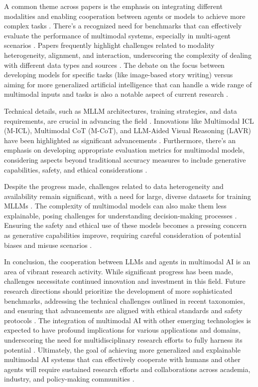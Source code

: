 \documentclass[conference]{IEEEtran}
\begin{document}
A common theme across papers is the emphasis on integrating different modalities and enabling cooperation between agents or models to achieve more complex tasks \cite{b5}. There's a recognized need for benchmarks that can effectively evaluate the performance of multimodal systems, especially in multi-agent scenarios \cite{b6}. Papers frequently highlight challenges related to modality heterogeneity, alignment, and interaction, underscoring the complexity of dealing with different data types and sources \cite{b7}. The debate on the focus between developing models for specific tasks (like image-based story writing) versus aiming for more generalized artificial intelligence that can handle a wide range of multimodal inputs and tasks is also a notable aspect of current research \cite{b8}.

Technical details, such as MLLM architectures, training strategies, and data requirements, are crucial in advancing the field \cite{b9}. Innovations like Multimodal ICL (M-ICL), Multimodal CoT (M-CoT), and LLM-Aided Visual Reasoning (LAVR) have been highlighted as significant advancements \cite{b10}. Furthermore, there's an emphasis on developing appropriate evaluation metrics for multimodal models, considering aspects beyond traditional accuracy measures to include generative capabilities, safety, and ethical considerations \cite{b11}.

Despite the progress made, challenges related to data heterogeneity and availability remain significant, with a need for large, diverse datasets for training MLLMs \cite{b12}. The complexity of multimodal models can also make them less explainable, posing challenges for understanding decision-making processes \cite{b13}. Ensuring the safety and ethical use of these models becomes a pressing concern as generative capabilities improve, requiring careful consideration of potential biases and misuse scenarios \cite{b14}.

In conclusion, the cooperation between LLMs and agents in multimodal AI is an area of vibrant research activity. While significant progress has been made, challenges necessitate continued innovation and investment in this field. Future research directions should prioritize the development of more sophisticated benchmarks, addressing the technical challenges outlined in recent taxonomies, and ensuring that advancements are aligned with ethical standards and safety protocols \cite{b15}. The integration of multimodal AI with other emerging technologies is expected to have profound implications for various applications and domains, underscoring the need for multidisciplinary research efforts to fully harness its potential \cite{b16}. Ultimately, the goal of achieving more generalized and explainable multimodal AI systems that can effectively cooperate with humans and other agents will require sustained research efforts and collaborations across academia, industry, and policy-making communities \cite{b17}.
\end{document}
